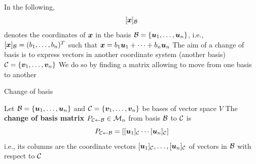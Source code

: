 \documentclass[aspectratio=169]{beamer}\usepackage[]{graphicx}\usepackage[]{xcolor}
\begin{document}


\begin{frame}
	In the following, 
	\[
	[\bm{x}]_{\mathcal{B}}
	\]
	denotes the coordinates of $\bm{x}$ in the basis $\mathcal{B}=\{\bm{u}_1,\ldots,\bm{u}_n\}$, i.e., $[\bm{x}]_{\mathcal{B}}=(b_1,\ldots,b_n)^T$ such that $\bm{x} = b_1\bm{u}_1+\cdots+b_n\bm{u}_n$
	\vfill
	The aim of a change of basis is to express vectors in another coordinate system (another basis) $\mathcal{C}=\{\bm{v}_1,\ldots,\bm{v}_n\}$
	\vfill
	We do so by finding a matrix allowing to move from one basis to another
\end{frame}

\begin{frame}{Change of basis}
\begin{importantdefinition}
Let $\mathcal{B}=\{\bm{u}_1,\ldots,\bm{u}_n\}$ and $\mathcal{C}=\{\bm{v}_1,\ldots,\bm{v}_n\}$ be bases of vector space $V$
\vskip0.5cm
The \textbf{change of basis matrix} $P_{\mathcal{C}\leftarrow\mathcal{B}}\in\mathcal{M}_n$ from basis $\mathcal{B}$ to $\mathcal{C}$ is
\[
P_{\mathcal{C}\leftarrow\mathcal{B}}
=\left[
[\bm{u}_1]_{\mathcal{C}} \cdots [\bm{u}_n]_{\mathcal{C}}
\right]
\]
i.e., its columns are the coordinate vectors $[\bm{u}_1]_{\mathcal{C}},\ldots,[\bm{u}_n]_{\mathcal{C}}$ of vectors in $\mathcal{B}$ with respect to $\mathcal{C}$
\end{importantdefinition}
\end{frame}
\end{document}
